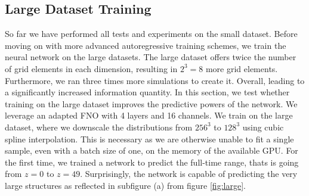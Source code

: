 \documentclass{article}
\begin{document}
\subsection{Large Dataset Training}

So far we have performed all tests and experiments on the small dataset. Before moving on with more advanced autoregressive training schemes, we train the neural network on the large datasets. The large dataset offers twice the number of grid elements in each dimension, resulting in $2^3 = 8$ more grid elements. Furthermore, we ran three times more simulations to create it. Overall, leading to a significantly increased information quantity. In this section, we test whether training on the large dataset improves the predictive powers of the network. We leverage an adapted FNO with 4 layers and 16 channels. We train on the large dataset, where we downscale the distributions from $256^3$ to $128^3$ using cubic spline interpolation. This is necessary as we are otherwise unable to fit a single sample, even with a batch size of one, on the memory of the available GPU.  For the first time, we trained a network to predict the full-time range, thats is going from $z=0$ to $z=49$. Surprisingly, the network is capable of predicting the very large structures as reflected in subfigure (a) from figure \ref{fig:large}.
\end{document}
